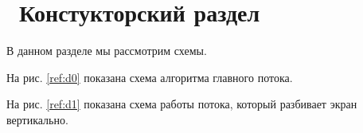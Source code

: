 \chapter{ Констукторский раздел}
\label{cha:design}

В данном разделе мы рассмотрим схемы.

На рис. \ref{ref:d0} показана схема алгоритма главного потока.

\begin{figure}[ht!]
\end{figure}

На рис. \ref{ref:d1} показана схема работы потока, который разбивает
экран вертикально. 

